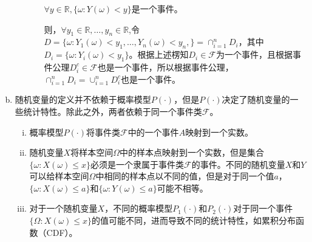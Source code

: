\documentclass[UTF8]{article}
\begin{document}
\begin{enumerate}[a)]
\begin{enumerate}[i.]
\begin{enumerate}[(1)]
                        $\forall y\in\mathbb{R}, \{\omega:Y(\omega)<y\}$是一个事件。 
                        
                       则，$\forall y_1\in\mathbb{R},\dots,y_n\in\mathbb{R}$,令$D=\{\omega:Y_1(\omega)<y_1,\dots,Y_n(\omega)<y_n,\}=\cap^n_{i=1}D_i$，其中$D_i=\{\omega:Y_i(\omega)<y_1\}$。根据上述楞知$D_i\in\mathcal{F}$为一个事件，且根据事件公理$D_i^c\in\mathcal{F}$也是一个事件，所以根据事件公理，$\cap^n_{i=1}D_i=\cup^n_{i=1}D_i^c$也是一个事件。
                    \end{enumerate}
              \end{enumerate}
    \item 随机变量的定义并不依赖于概率模型$P(\cdot)$，但是$P(\cdot)$决定了随机变量的一些统计特性。除此之外，两者依赖于同一个事件类$\mathcal{F}$。
              \begin{enumerate}[i.]
                  \item 概率模型$P(\cdot)$将事件类$\mathcal{F}$中的一个事件$A$映射到一个实数。
                  \item 随机变量$X$将样本空间$\Omega$中的样本点映射到一个实数，但是集合$\{\omega:X(\omega)\leq x\}$必须是一个隶属于事件类$\mathcal{F}$的事件。不同的随机变量$X$和$Y$可以给样本空间$\Omega$中相同的样本点以不同的值，但是对于同一个值$a$，$\{\omega:X(\omega)\leq a\}$和$\{\omega:Y(\omega)\leq a\}$可能不相等。
                  \item 对于一个随机变量$X$，不同的概率模型$P_1(\cdot)$和$P_2(\cdot)$对于同一个事件$\{\Omega:X(\omega)\leq x\}$的值可能不同，进而导致不同的统计特性，如累积分布函数（CDF）。
              \end{enumerate}
\end{enumerate}
\end{document}
